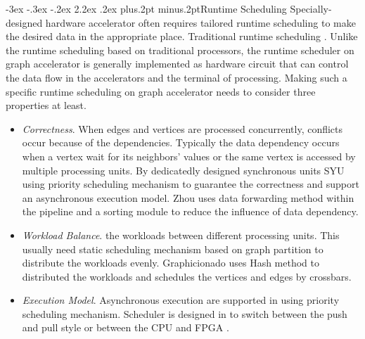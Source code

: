 \documentclass[twoside]{article}
\makeatletter
\def\section{\@startsection{section}{1}{\z@}%
 {-3ex \@plus -.3ex \@minus -.2ex}%
 {2.2ex \@plus.2ex}%
{\normalfont\normalsize\protect\baselineskip=14.5pt plus.2pt minus.2pt\bfseries}}
\makeatother
\begin{document}
\begin{multicols}{2}
\section{Runtime Scheduling}
{\color{blue}
}
Specially-designed hardware accelerator often requires tailored runtime scheduling to make the desired data in the appropriate place. Traditional runtime scheduling . Unlike the runtime scheduling based on traditional processors, the runtime scheduler on graph accelerator is generally implemented as hardware circuit that can control the data flow in the accelerators and the terminal of processing. 
Making such a specific runtime scheduling on graph accelerator needs to consider three properties at least.
\begin{itemize}[leftmargin=*]
\item {\em Correctness}. When edges and vertices are processed concurrently, conflicts occur because of the dependencies. Typically the data dependency occurs when a vertex wait for its neighbors' values or the same vertex is accessed by multiple processing units. By dedicatedly designed synchronous units SYU \cite{ozdal2016energy} using priority scheduling mechanism to guarantee the correctness and support an asynchronous execution model. Zhou \cite{zhou2015fpgasssp,zhou2016highthroughput} uses data forwarding method within the pipeline and a sorting module to reduce the influence of data dependency.

\item {\em Workload Balance}. the workloads between different processing units. This usually need static scheduling mechanism based on graph partition to distribute the workloads evenly. Graphicionado \cite{ham2016graphicionado} uses Hash method to distributed the workloads and schedules the vertices and edges by crossbars. 

\item {\em Execution Model}. Asynchronous execution are supported in \cite{ozdal2016energy} using priority scheduling mechanism. Scheduler is designed in \cite{zhou2017cpufpga} to switch between the push and pull style \cite{umuroglu2015hybridbfsfpga} or between the CPU and FPGA \cite{zhou2017cpufpga}.
\end{itemize}


\end{multicols}
\end{document}
